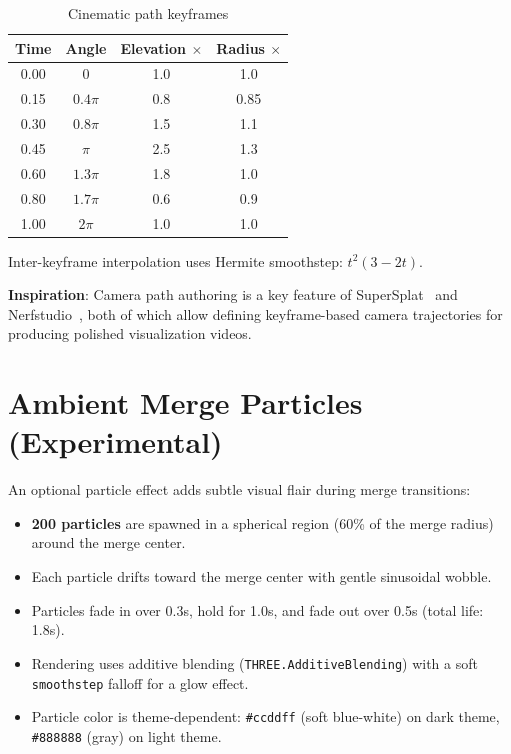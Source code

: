 \documentclass[11pt, letterpaper]{article}
\begin{document}
\begin{table}[H]
\centering
\caption{Cinematic path keyframes}
\begin{tabular}{@{}cccc@{}}
\toprule
\textbf{Time} & \textbf{Angle} & \textbf{Elevation $\times$} & \textbf{Radius $\times$} \\
\midrule
0.00 & $0$ & 1.0 & 1.0 \\
0.15 & $0.4\pi$ & 0.8 & 0.85 \\
0.30 & $0.8\pi$ & 1.5 & 1.1 \\
0.45 & $\pi$ & 2.5 & 1.3 \\
0.60 & $1.3\pi$ & 1.8 & 1.0 \\
0.80 & $1.7\pi$ & 0.6 & 0.9 \\
1.00 & $2\pi$ & 1.0 & 1.0 \\
\bottomrule
\end{tabular}
\end{table}

Inter-keyframe interpolation uses Hermite smoothstep: $t^2(3 - 2t)$.

\textbf{Inspiration}: Camera path authoring is a key feature of SuperSplat~\cite{supersplat} and Nerfstudio~\cite{nerfstudio}, both of which allow defining keyframe-based camera trajectories for producing polished visualization videos.

\section{Ambient Merge Particles (Experimental)}

An optional particle effect adds subtle visual flair during merge transitions:

\begin{itemize}
    \item \textbf{200 particles} are spawned in a spherical region (60\% of the merge radius) around the merge center.
    \item Each particle drifts toward the merge center with gentle sinusoidal wobble.
    \item Particles fade in over 0.3s, hold for 1.0s, and fade out over 0.5s (total life: 1.8s).
    \item Rendering uses additive blending (\texttt{THREE.AdditiveBlending}) with a soft \texttt{smoothstep} falloff for a glow effect.
    \item Particle color is theme-dependent: \texttt{\#ccddff} (soft blue-white) on dark theme, \texttt{\#888888} (gray) on light theme.
\end{itemize}
\end{document}
